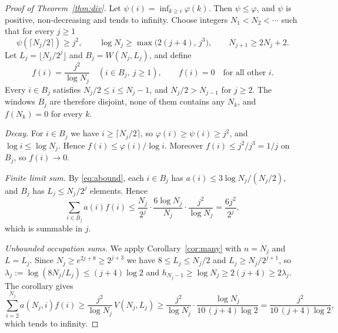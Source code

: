 \documentclass[11pt]{amsart}
\theoremstyle{remark}
\numberwithin{equation}{section}
\begin{document}
\begin{proof}[Proof of Theorem~\ref{thm:div}]
Let $\psi(i)=\inf_{k\ge i}\varphi(k)$. Then $\psi\le\varphi$, and $\psi$ is positive, non-decreasing and tends to
infinity. Choose integers $N_1<N_2<\cdots$ such that for every $j\ge1$
\[
\psi(\lceil N_j/2\rceil)\ge j^2,\qquad\log N_j\ge\max\bigl(2(j+4),\,j^3\bigr),\qquad N_{j+1}\ge2N_j+2 .
\]
Let $L_j=\lfloor N_j/2^{j}\rfloor$ and $B_j=W(N_j,L_j)$, and define
\[
f(i)=\frac{j^2}{\log N_j}\quad(i\in B_j,\ j\ge1),\qquad f(i)=0\quad\text{for all other }i .
\]
Every $i\in B_j$ satisfies $N_j/2\le i\le N_j-1$, and $N_j/2>N_{j-1}$ for $j\ge2$. The windows $B_j$ are therefore disjoint, none of
them contains any $N_k$, and $f(N_k)=0$ for every $k$.

\emph{Decay.} For $i\in B_j$ we have $i\ge\lceil N_j/2\rceil$, so $\varphi(i)\ge\psi(i)\ge j^2$, and $\log i\le\log N_j$.
Hence $f(i)\le\varphi(i)/\log i$. Moreover $f(i)\le j^2/j^3=1/j$ on $B_j$, so $f(i)\to0$.

\emph{Finite limit sum.} By \eqref{eq:abound}, each $i\in B_j$ has $a(i)\le3\log N_j/(N_j/2)$, and $B_j$ has
$L_j\le N_j/2^{j}$ elements. Hence
\[
\sum_{i\in B_j}a(i)f(i)\le\frac{N_j}{2^{j}}\cdot\frac{6\log N_j}{N_j}\cdot\frac{j^2}{\log N_j}=\frac{6j^2}{2^{j}},
\]
which is summable in $j$.

\emph{Unbounded occupation sums.} We apply Corollary~\ref{cor:many} with $n=N_j$ and $L=L_j$. Since
$N_j\ge e^{2j+8}\ge2^{j+3}$ we have $8\le L_j\le N_j/2$ and $L_j\ge N_j/2^{j+1}$, so
$\lambda_j:=\log(8N_j/L_j)\le(j+4)\log2$ and $h_{N_j-1}\ge\log N_j\ge2(j+4)\ge2\lambda_j$. The corollary gives
\[
\sum_{i=2}^{N_j}a(N_j,i)f(i)\ge\frac{j^2}{\log N_j}\,V(N_j,L_j)\ge\frac{j^2}{\log N_j}\cdot\frac{\log N_j}{10\,(j+4)\log2}
=\frac{j^2}{10\,(j+4)\log2},
\]
which tends to infinity.
\end{proof}
\end{document}

